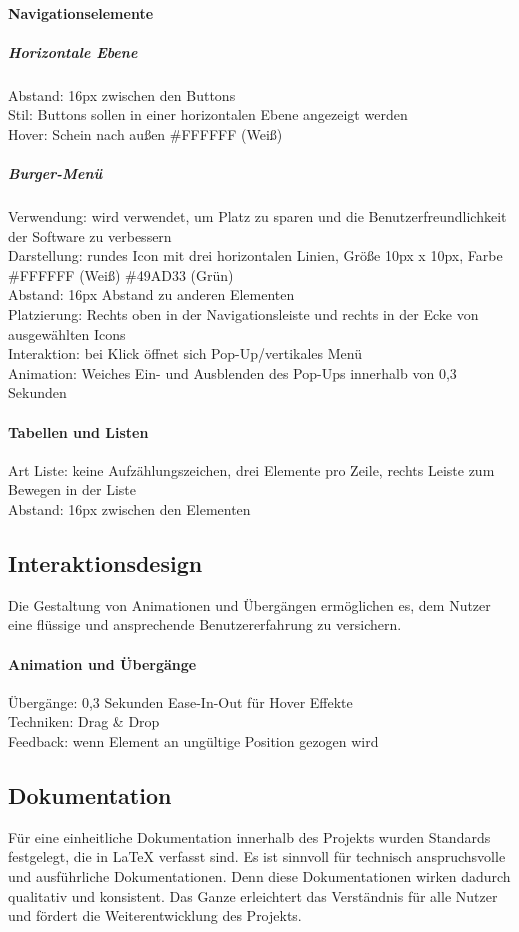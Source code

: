 \paragraph{Navigationselemente}
\subparagraph{Horizontale Ebene}
Abstand: 16px zwischen den Buttons\\
Stil: Buttons sollen in einer horizontalen Ebene angezeigt werden\\
Hover: Schein nach außen \#FFFFFF (Weiß)

\subparagraph{Burger-Menü}
Verwendung: wird verwendet, um Platz zu sparen und die Benutzerfreundlichkeit der Software zu verbessern\\
Darstellung: rundes Icon mit drei horizontalen Linien, Größe 10px x 10px, Farbe \#FFFFFF (Weiß) \#49AD33 (Grün)\\
Abstand: 16px Abstand zu anderen Elementen\\
Platzierung: Rechts oben in der Navigationsleiste und rechts in der Ecke von ausgewählten Icons\\
Interaktion: bei Klick öffnet sich Pop-Up/vertikales Menü\\
Animation: Weiches Ein- und Ausblenden des Pop-Ups innerhalb von 0,3 Sekunden

\paragraph{Tabellen und Listen}
Art Liste: keine Aufzählungszeichen, drei Elemente pro Zeile, rechts Leiste zum Bewegen in der Liste\\
Abstand: 16px zwischen den Elementen

\subsection{Interaktionsdesign}
Die Gestaltung von Animationen und Übergängen ermöglichen es, dem Nutzer eine flüssige und ansprechende Benutzererfahrung zu versichern.

\paragraph{Animation und Übergänge}
Übergänge: 0,3 Sekunden Ease-In-Out für Hover Effekte\\
Techniken: Drag \& Drop\\
Feedback: wenn Element an ungültige Position gezogen wird

\subsection{Dokumentation}
Für eine einheitliche Dokumentation innerhalb des Projekts wurden Standards festgelegt, die in LaTeX verfasst sind.
Es ist sinnvoll für technisch anspruchsvolle und ausführliche Dokumentationen. Denn diese Dokumentationen wirken dadurch qualitativ und konsistent.
Das Ganze erleichtert das Verständnis für alle Nutzer und fördert die Weiterentwicklung des Projekts.

